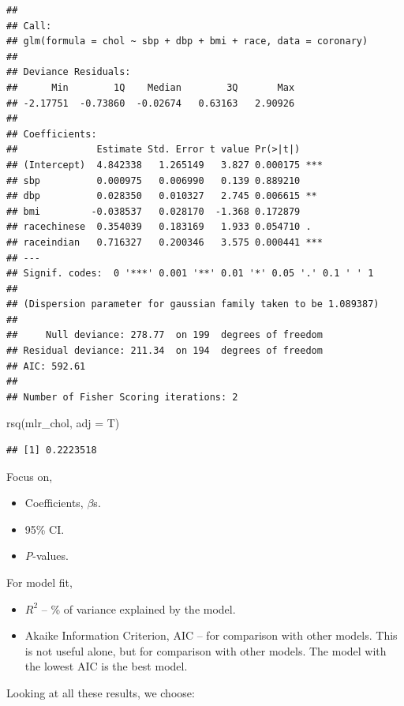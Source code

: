 \documentclass[
]{book}
\makeatletter
\newenvironment{Shaded}{\begin{snugshade}}{\end{snugshade}}
\newcommand{\AttributeTok}[1]{\textcolor[rgb]{0.61,0.61,0.61}{#1}}
\newcommand{\FunctionTok}[1]{\textcolor[rgb]{0,0,0}{#1}}
\newcommand{\NormalTok}[1]{#1}
\providecommand{\tightlist}{%
  \setlength{\itemsep}{0pt}\setlength{\parskip}{0pt}}
\newenvironment{kframe}{%
\medskip{}
\setlength{\fboxsep}{.8em}
 \def\at@end@of@kframe{}%
 \ifinner\ifhmode%
  \def\at@end@of@kframe{\end{minipage}}%
  \begin{minipage}{\columnwidth}%
 \fi\fi%
 \def\FrameCommand##1{\hskip\@totalleftmargin \hskip-\fboxsep
 \colorbox{shadecolor}{##1}\hskip-\fboxsep
     \hskip-\linewidth \hskip-\@totalleftmargin \hskip\columnwidth}%
 \MakeFramed {\advance\hsize-\width
   \@totalleftmargin\z@ \linewidth\hsize
   \@setminipage}}%
 {\par\unskip\endMakeFramed%
 \at@end@of@kframe}
\renewenvironment{Shaded}{\begin{kframe}}{\end{kframe}}
\makeatother
\begin{document}
\begin{verbatim}
## 
## Call:
## glm(formula = chol ~ sbp + dbp + bmi + race, data = coronary)
## 
## Deviance Residuals: 
##      Min        1Q    Median        3Q       Max  
## -2.17751  -0.73860  -0.02674   0.63163   2.90926  
## 
## Coefficients:
##              Estimate Std. Error t value Pr(>|t|)    
## (Intercept)  4.842338   1.265149   3.827 0.000175 ***
## sbp          0.000975   0.006990   0.139 0.889210    
## dbp          0.028350   0.010327   2.745 0.006615 ** 
## bmi         -0.038537   0.028170  -1.368 0.172879    
## racechinese  0.354039   0.183169   1.933 0.054710 .  
## raceindian   0.716327   0.200346   3.575 0.000441 ***
## ---
## Signif. codes:  0 '***' 0.001 '**' 0.01 '*' 0.05 '.' 0.1 ' ' 1
## 
## (Dispersion parameter for gaussian family taken to be 1.089387)
## 
##     Null deviance: 278.77  on 199  degrees of freedom
## Residual deviance: 211.34  on 194  degrees of freedom
## AIC: 592.61
## 
## Number of Fisher Scoring iterations: 2
\end{verbatim}

\begin{Shaded}
\begin{Highlighting}[]
\FunctionTok{rsq}\NormalTok{(mlr\_chol, }\AttributeTok{adj =}\NormalTok{ T)}
\end{Highlighting}
\end{Shaded}

\begin{verbatim}
## [1] 0.2223518
\end{verbatim}

Focus on,

\begin{itemize}
\tightlist
\item
  Coefficients, \(\beta\)s.
\item
  95\% CI.
\item
  \emph{P}-values.
\end{itemize}

For model fit,

\begin{itemize}
\tightlist
\item
  \(R^2\) -- \% of variance explained by the model.
\item
  Akaike Information Criterion, AIC -- for comparison with other models. This is not useful alone, but for comparison with other models. The model with the lowest AIC is the best model.
\end{itemize}

Looking at all these results, we choose:
\end{document}
